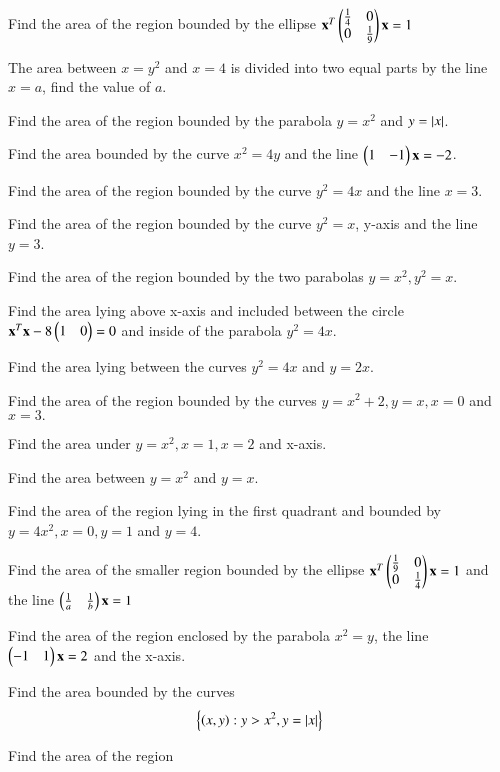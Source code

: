 \item  Find the area of the region bounded by the ellipse 
$
\mathbf{x}^T\begin{pmatrix}\frac{1}{4} & 0 \\ 0 & \frac{1}{9}\end{pmatrix}\mathbf{x} = 1
$
\item The area between $x=y^2$ and $x=4$ is divided into two equal parts by the line $x=a$, find the value of $a$.
\item  Find the area of the region bounded by the parabola $y = x^2$ and $y = \left\vert x\right\vert$.
\item  Find the area bounded by the curve $x^2 = 4y$ and the line $\begin{pmatrix}1 & -1\end{pmatrix}\mathbf{x} = -2$.
\\
\solution

\item  Find the area of the region bounded by the curve $y^2 = 4x$ and the line $x = 3$.
%
\item Find the area of the region bounded by the curve $y^2 = x$, y-axis and the line $y = 3$.
%
\item Find the area of the region bounded by the two parabolas $y = x^2, y^2=x$.
\item Find the area lying above x-axis and included between the circle $\mathbf{x}^T\mathbf{x} -8\begin{pmatrix}1 & 0\end{pmatrix}= 0$  and inside of the parabola $y^2 = 4x$.
\item Find the area lying between the curves $y^2 = 4x$ and $y = 2x$.
\item  Find the area of the region bounded by the curves $y = x^2+2, y = x, x = 0$ and $ x = 3.$
%
\item Find the area under $y = x^2, x = 1, x = 2$ and x-axis.
\item Find the area between  $y = x^2$ and $y = x$.
\item Find the area of the region lying in the first quadrant and bounded by $y = 4x^2, x = 0, y = 1$ and $y = 4$.
\item Find the area of the smaller region bounded by the ellipse
$
\mathbf{x}^T\begin{pmatrix}\frac{1}{9} & 0 \\ 0 & \frac{1}{4}\end{pmatrix}\mathbf{x} = 1
$
and the line 
$
\begin{pmatrix}\frac{1}{a} & \frac{1}{b}\end{pmatrix}\mathbf{x} = 1
$
\item Find the area of the region enclosed by the parabola $x^2=y$, the line $\begin{pmatrix}-1 & 1\end{pmatrix}\mathbf{x} = 2$ and the x-axis.
%
\item Find the area bounded by the curves
\begin{align}
\left\{\left(x,y\right) : y > x^2, y = \left\vert x\right\vert\right\}
\end{align}
%
\item Find the area of the region
